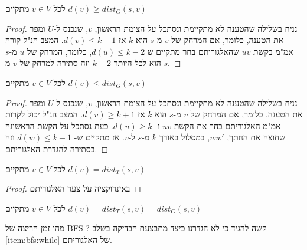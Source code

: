 \begin{claim}
לכל
$v \in V$
מתקיים
$d(v) \geq dist_G(s, v)$
\end{claim}
\begin{proof}
נניח בשלילה שהטענה לא מתקיימת ונסתכל על הצומת הראשון, $v$, 
שנכנס ל-$U$ ומפר את הטענה, כלומר, 
אם המרחק של $v$ מ-$s$ הוא $k$ אז
$d(v) \leq k - 1$.
המצב הנ"ל קורה אמ"מ בקשת 
$uv$
שהאלגוריתם בחר מתקיים ש
$d(u) \leq k - 2$,
כלומר, המרחק של $u$ מ-$s$ הוא לכל היותר 
$k - 2$
וזה סתירה למרחק של $v$ מ-$s$.
\end{proof}

\begin{claim}
לכל
$v \in V$
מתקיים
$d(v) \leq dist_G(s,v)$
\end{claim}
\begin{proof}
נניח בשלילה שהטענה לא מתקיימת ונסתכל על הצומת הראשון, $v$, 
שנכנס ל-$U$ ומפר את הטענה, כלומר, 
אם המרחק של $v$ מ-$s$ הוא $k$ אז 
$d(v) \geq k + 1$.
המצב הנ"ל יכול לקרות אמ"מ האלגוריתם בחר את הקשת 
$uv$
ו-%
$d(u) \geq k$.
כעת נסתכל על הקשת הראשונה שחוצה את החתך, 
$ww'$,
במסלול באורך $k$ מ-$s$ ל-$v$.
אז מתקיים ש-%
$d(w) \leq k - 1$
וזה בסתירה להגדרת האלגוריתם.
\end{proof}

\begin{claim}
לכל
$v \in V$
מתקיים
$d(v) = dist_T(s,v)$
\end{claim}
\begin{proof}
באינדוקציה על צעד האלגוריתם
\end{proof}


\begin{theorem}
לכל
$v \in V$
מתקיים
$d(v) = dist_T(s,v) = dist_G(s,v)$
\end{theorem}
מהו זמן הריצה של BFS ? קשה להגיד כי לא הגדרנו כיצד מתבצעת הבדיקה בשלב 
\ref{item:bfs:while}
של האלגוריתם.
